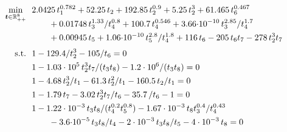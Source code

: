 \begin{align}
    \min_{\bm{t} \in \mathbb{R}^8_{++}} ~~& 2.0425\, t_{1}^{0.782} + 52.25\, t_{2} + 192.85\, t_{2}^{0.9} + 5.25\, t_{2}^3 + 61.465\, t_{6}^{0.467} \label{prob:ex2} \\[-0.75em]
    & \qquad + 0.01748\,  t_{3}^{1.33} / t_{4}^{0.8} + 100.7\, t_{4}^{0.546} + 3.66 {\cdot 10}^{-10} \, t_{3}^{2.85}/ t_{4}^{1.7} \nonumber \\
    & \qquad + 0.00945\, t_{5} + 1.06 {\cdot 10}^{-10}\, t_{5}^{2.8}/t_{4}^{1.8} + 116\, t_{6} - 205\, t_{6} t_{7} - 278\, t_{2}^3 t_{7} \nonumber \\[0.25em]
    \text{s.t.}~~ & 1 - 129.4/t_{2}^3 - 105/t_{6} = 0 \nonumber \\
    & 1 - 1.03\cdot 10^5 \, t_{2}^3 t_{7}/(t_{3} t_{8}) - 1.2\cdot 10^6 /(t_{3} t_{8}) = 0 \nonumber \\
    & 1 - 4.68\, t_{2}^3/t_{1} - 61.3\, t_{2}^2/t_{1} - 160.5\, t_{2}/t_{1} = 0 \nonumber \\
    & 1 - 1.79\, t_{7} - 3.02\, t_{2}^3 t_{7}/t_{6} - 35.7\, /t_{6} - 1 = 0 \nonumber \\
    & 1 - 1.22\cdot 10^{-3}\, t_{3} t_{8}/(t_{4}^{0.2} t_{5}^{0.8}) - 1.67\cdot 10^{-3}\, t_{8} t_{3}^{0.4}/ t_{4}^{0.43} \nonumber \\[-0.0em] & \qquad - 3.6 {\cdot 10}^{-5}\, t_{3} t_{8}/t_{4} - 2\cdot 10^{-3}\, t_{3} t_{8}/t_{5} - 4\cdot 10^{-3}\, t_{8} = 0 \nonumber
\end{align}

\iffalse
\begin{remark}
    This model first appeared in \cite{BW1969-sig-ChemE}, which was written very much for practicing engineers.
    Later, the problem was considered as an example for a proposed algorithm for equality-constrained signomial programming \cite{BW1971}.
    We used the formulation \cite{BW1971} since it was easier to read than that in \cite{BW1969-sig-ChemE}.
    However, there is a clear typo in \cite[Equation 4]{BW1971}: the term ``$d_V^2/W$'' appears with two different coefficients.
    We consulted the original paper \cite{BW1969-sig-ChemE} and believe the correct version of \cite[Equation 4]{BW1971} is $4.68 d_V^3/W + 6.13 d_V^2/ W + 160.5 d_V/ W = 1$.
    Our comparisons to alternative SAGE-based techniques and global solvers are equally informative regardless of whether our correction was valid.
\end{remark}
\fi